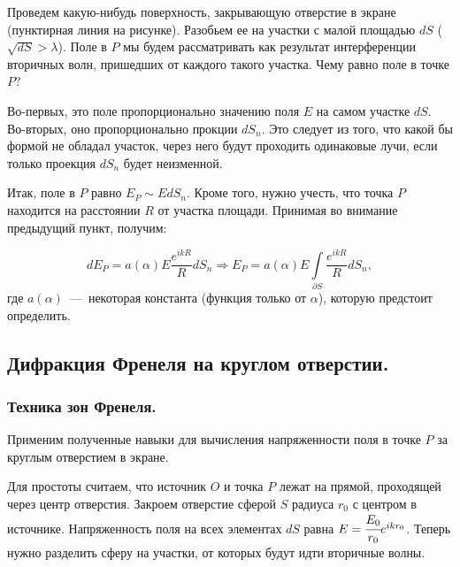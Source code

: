 \documentclass[12pt,a4paper]{article}
\numberwithin{equation}{section}
\numberwithin{equation}{section}
\begin{document}
Проведем какую-нибудь поверхность, закрывающую отверстие в экране
(пунктирная линия на рисунке). Разобьем ее на участки с малой площадью
$dS$ ($\sqrt{dS} > \lambda$). Поле в $P$ мы будем рассматривать как
результат интерференции вторичных волн, пришедших от каждого такого
участка. Чему равно поле в точке $P$?

Во-первых, это поле пропорционально значению поля $E$ на самом участке
$dS$. Во-вторых, оно пропорционально прокции $dS_n$. Это следует из
того, что какой бы формой не обладал участок, через него будут
проходить одинаковые лучи, если только проекция $dS_n$ будет
неизменной.

Итак, поле в $P$ равно $E_P \sim E dS_n$. Кроме того, нужно учесть,
что точка $P$ находится на расстоянии $R$ от участка площади. Принимая
во внимание предыдущий пункт, получим:

\begin{equation}
  dE_P = a(\alpha) E\frac{e^{ikR}}{R} dS_n \Rightarrow E_P = a(\alpha) E \int\limits_{\partial S} \frac{e^{ikR}}{R} dS_n,
\end{equation}
где $a(\alpha)$~---~некоторая константа (функция только от $\alpha$),
которую предстоит определить.

\subsection{Дифракция Френеля на круглом отверстии.}
\label{sec:diffraction_round}
\subsubsection{Техника зон Френеля.}
\label{sec:fresnel_zones}
Применим полученные навыки для вычисления напряженности поля в точке $P$ за круглым отверстием в экране. 

Для простоты считаем, что источник $O$ и точка $P$ лежат на прямой,
проходящей через центр отверстия. Закроем отверстие сферой $S$ радиуса
$r_0$ с центром в источнике. Напряженность поля на всех элементах $dS$
равна $E = \cfrac{E_0}{r_0} e^{i k r_0}$. Теперь нужно разделить сферу
на участки, от которых будут идти вторичные волны.
\end{document}

